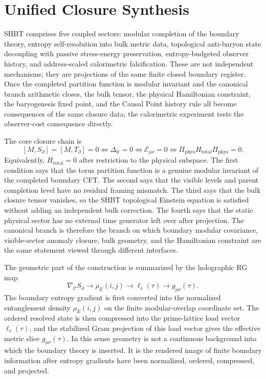 \documentclass[11pt,letterpaper]{article}
\theoremstyle{plain}
\newcommand{\Deltafr}{\Delta_{\text{fr}}}
\newcommand{\Ebulk}{\mathcal E_{\mu\nu}}
\newcommand{\Htotal}{H_{\text{total}}}
\begin{document}
\section{Unified Closure Synthesis}
\label{sec:closure-synthesis-conclusions}

SHBT comprises five coupled sectors:
modular completion of the boundary theory, entropy self-resolution into bulk
metric data, topological anti-baryon state decoupling with passive stress-energy preservation,
entropy-budgeted observer history, and address-scaled calorimetric
falsification.  These are not independent mechanisms; they are projections of the same
finite closed boundary register.  Once the completed partition function is
modular invariant and the canonical branch arithmetic closes, the bulk tensor,
the physical Hamiltonian constraint, the baryogenesis fixed point, and the
Causal Point history rule all become consequences of the same closure data;
the calorimetric experiment tests the observer-cost consequence directly.

The core closure chain is
\begin{equation}
\label{eq:section-nine-closure-chain}
 \boxed{
 [M,S_{\partial}]=[M,T_{\partial}]=0
 \Longleftrightarrow
 \Deltafr=0
 \Longleftrightarrow
 \Ebulk=0
 \Longleftrightarrow
 \Pi_{\text{phys}}\Htotal\Pi_{\text{phys}}=0.
 }
\end{equation}
Equivalently, $\Htotal=0$ after restriction to the physical subspace.  The
first condition says that the torus partition function is a genuine modular
invariant of the completed boundary CFT.  The second says that the visible
levels and parent completion level have no residual framing mismatch.  The
third says that the bulk closure tensor vanishes, so the SHBT topological
Einstein equation is satisfied without adding an independent bulk correction.
The fourth says that the static physical sector has no external time generator
left over after projection.  The canonical branch is therefore the branch on
which boundary modular covariance,
visible-sector anomaly closure, bulk geometry, and the Hamiltonian constraint
are the same statement viewed through different interfaces.

The geometric part of the construction is summarized by the holographic RG
map
\begin{equation}
\label{eq:section-nine-rg-map}
 \boxed{
 \nabla_{\mathcal C}S_{\partial}
 \longrightarrow
 \rho_E(i,j)
 \longrightarrow
 \ell_r(\tau)
 \longrightarrow
 g_{\mu\nu}(\tau).
 }
\end{equation}
The boundary entropy gradient is first converted into the normalized
entanglement density $\rho_E(i,j)$ on the finite modular-overlap coordinate
set.  The ordered resolved state is then compressed into the prime-lattice load
vector $\ell_r(\tau)$, and the stabilized Gram projection of this load vector
gives the effective metric slice $g_{\mu\nu}(\tau)$.  In this sense geometry is
not a continuous background into which the boundary theory is inserted.  It is
the rendered image of finite boundary information after entropy gradients have
been normalized, ordered, compressed, and projected.
\end{document}
